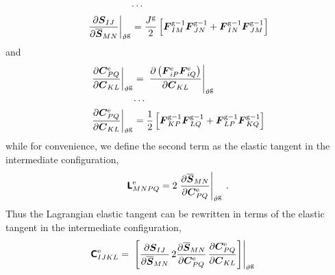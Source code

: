 \documentclass[10pt,letterpaper,oneside]{report}
\newcommand{\ten}[1]{\mbox{\boldmath $#1$}{}}
\newcommand{\tenf}[1]{\mbox{{\sffamily{\bfseries {#1}}}}}
\newcommand{\scas}[1]{\mbox{{\scriptsize{${\rm{#1}}$}}}{}}
\begin{document}
\begin{itemize}
\begin{align}
\cdots{}& \notag \\
\left. \frac{ \partial \ten{S}_{IJ} }{ \partial \overline{\ten{S}}_{MN} } \right|_{\vartheta^{\scas{g}}} 
={}& \frac{J^{\scas{g}}}{2} \left[ \ten{F}^{\scas{g}-1}_{IM} \ten{F}^{\scas{g}-1}_{JN} + \ten{F}^{\scas{g}-1}_{IN} \ten{F}^{\scas{g}-1}_{JM} \right]  
\end{align}
and
\begin{align}
\left. \frac{ \partial \ten{C}^{\scas{e}}_{PQ} }{ \partial \ten{C}_{KL} } \right|_{\vartheta^{\scas{g}}} 
={}& \left. \frac{ \partial \left( \ten{F}^{\scas{e}}_{iP} \ten{F}^{\scas{e}}_{iQ} \right) }{ \partial \ten{C}_{KL} } \right|_{\vartheta^{\scas{g}}} 
\\
\cdots{}& \notag \\
\left. \frac{ \partial \ten{C}^{\scas{e}}_{PQ} }{ \partial \ten{C}_{KL} } \right|_{\vartheta^{\scas{g}}} 
={}& \frac{1}{2} \left[ \ten{F}^{\scas{g}-1}_{KP} \ten{F}^{\scas{g}-1}_{LQ} 
+ \ten{F}^{\scas{g}-1}_{LP} \ten{F}^{\scas{g}-1}_{KQ} \right] 
\end{align}
while for convenience, we define the second term as the elastic tangent in the intermediate configuration,
\begin{equation}
\tenf{L}^{\scas{e}}_{MNPQ} = 2 \left. \frac{\partial \overline{\ten{S}}_{MN} }{\partial \ten{C}^{\scas{e}}_{PQ} } \right|_{\vartheta^{\scas{g}}} \, .
\end{equation}
Thus the Lagrangian elastic tangent can be rewritten in terms of the elastic tangent in the intermediate configuration,   
\begin{align}
\tenf{C}^{\scas{e}}_{IJKL} ={}& \left. \left[ \frac{ \partial \ten{S}_{IJ} }{ \partial \overline{\ten{S}}_{MN} } \, 2 \frac{ \partial \overline{\ten{S}}_{MN} }{ \partial \ten{C}^{\scas{e}}_{PQ} } \, \frac{ \partial \ten{C}^{\scas{e}}_{PQ} }{ \partial \ten{C}_{KL} } \right] \right|_{\vartheta^{\scas{g}}} 

\end{align}
\end{itemize}
\end{document}
